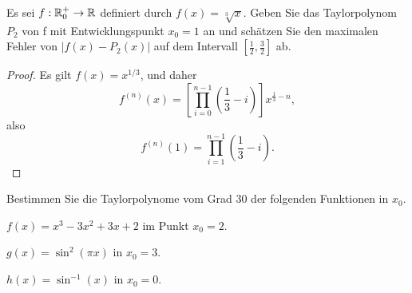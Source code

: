 \begin{Problem}
	Es sei $f : \mathbb{R}_0^+ \to \mathbb{R}$ definiert durch $f (x) = \sqrt[3]{x}$. Geben Sie das Taylorpolynom $P_2$ von f mit Entwicklungspunkt $x_0 = 1$ an und schätzen Sie den maximalen Fehler von $|f(x) - P_2(x)|$ auf dem Intervall $\left[ \frac{1}{2},\frac{3}{2} \right] $ ab.
\end{Problem}
\begin{proof}
	Es gilt $f(x)=x^{1 / 3}$, und daher
	\[
		f^{(n)}(x)=\left[\prod_{i=0}^{n-1} \left( \frac{1}{3}-i \right) \right]x^{\frac{1}{3}-n} 
	,\] 
	also
	\[
		f^{(n)}(1)=\prod_{i=1}^{n-1} \left( \frac{1}{3}-i \right)  
	.\] 
\end{proof}
\begin{Problem}
	Bestimmen Sie die Taylorpolynome vom Grad 30 der folgenden Funktionen in $x_0$.
	\begin{parts}
	\item $f(x)=x^3-3x^2+3x+2$ im Punkt $x_0=2$.
	\item $g(x)=\sin^2\left( \pi x \right) $ in $x_0=3$.
	\item $h(x)=\sin^{-1}(x)$ in $x_0=0$.
	\end{parts}
\end{Problem}
